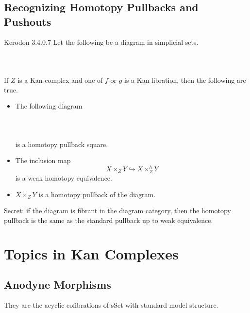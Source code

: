 \documentclass[a4paper]{article}
\begin{document}
\subsection{Recognizing Homotopy Pullbacks and Pushouts}
\begin{prp}{Kerodon 3.4.0.7}{} Let the following be a diagram in simplicial sets. \\~\\
\\~\\
If $Z$ is a Kan complex and one of $f$ or $g$ is a Kan fibration, then the following are true. 
\begin{itemize}
\item The following diagram \\~\\
\\~\\
is a homotopy pullback square. 
\item The inclusion map $$X\times_ZY\hookrightarrow X\times_Z^hY$$ is a weak homotopy equivalence. 
\item $X\times_ZY$ is a homotopy pullback of the diagram. 
\end{itemize}
\end{prp}

Secret: if the diagram is fibrant in the diagram category, then the homotopy pullback is the same as the standard pullback up to weak equivalence. 

\pagebreak
\section{Topics in Kan Complexes}
\subsection{Anodyne Morphisms}
They are the acyclic cofibrations of sSet with standard model structure. 
\end{document}
